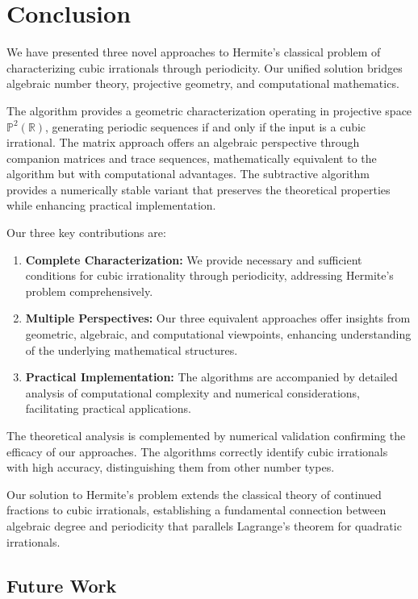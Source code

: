 \section{Conclusion}\label{sec:conclusion}

We have presented three novel approaches to Hermite's classical problem of characterizing cubic irrationals through periodicity. Our unified solution bridges algebraic number theory, projective geometry, and computational mathematics.

The \HAPD{} algorithm provides a geometric characterization operating in projective space $\mathbb{P}^2(\mathbb{R})$, generating periodic sequences if and only if the input is a cubic irrational. The matrix approach offers an algebraic perspective through companion matrices and trace sequences, mathematically equivalent to the \HAPD{} algorithm but with computational advantages. The subtractive algorithm provides a numerically stable variant that preserves the theoretical properties while enhancing practical implementation.

Our three key contributions are:
\begin{enumerate}
\item \textbf{Complete Characterization:} We provide necessary and sufficient conditions for cubic irrationality through periodicity, addressing Hermite's problem comprehensively.
\item \textbf{Multiple Perspectives:} Our three equivalent approaches offer insights from geometric, algebraic, and computational viewpoints, enhancing understanding of the underlying mathematical structures.
\item \textbf{Practical Implementation:} The algorithms are accompanied by detailed analysis of computational complexity and numerical considerations, facilitating practical applications.
\end{enumerate}

The theoretical analysis is complemented by numerical validation confirming the efficacy of our approaches. The algorithms correctly identify cubic irrationals with high accuracy, distinguishing them from other number types.

Our solution to Hermite's problem extends the classical theory of continued fractions to cubic irrationals, establishing a fundamental connection between algebraic degree and periodicity that parallels Lagrange's theorem for quadratic irrationals.

\subsection{Future Work}

